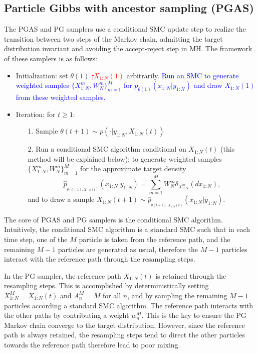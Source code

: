\documentclass[12pt]{article}
\newcommand{\fblue}[1]{\textcolor{blue}{{#1}}}
\newcommand{\fst}[1]{\textcolor{red}{\st{#1}}}
\def\phat{\widehat{p}}
\begin{document}
\subsection{Particle Gibbs with ancestor sampling (PGAS)}
The PGAS and PG samplers use a conditional SMC update step to realize the transition between two steps of the Markov chain, admitting the target distribution invariant and avoiding the accept-reject step in MH. The framework of these samplers is as follows:
\begin{itemize} \setlength\itemsep{0mm}
\item  Initialization: set $\theta(1)$ \fst{,$ X_{1:N}(1)$} arbitrarily. \fblue{Run an SMC to generate weighted samples $\{X_{1:N}^m, W_N^m\}_{m=1}^M$ for $p_{\theta(1)} (x_{1:N}|y_{1:N}) $ and draw $X_{1:N}(1)$ from these weighted samples. } 
\item Iteration: for $t\geq 1:$ 
\begin{itemize}\setlength\itemsep{0mm} \vspace{-1mm}
\item[1.] Sample $\theta(t+1)\sim p(\cdot| y_{1:N}, X_{1:N}(t))$ 
\item[2.] Run a conditional SMC algorithm conditional on $X_{1:N}(t)$ (this method will be explained below): to generate weighted samples $\{X_{1:N}^m, W_N^m\}_{m=1}^M$ for the approximate target density
\[ \phat_{_{\theta(t+1),X_{1:N}(t)}} (x_{1:N}|y_{1:N}) = \sum_{m=1}^M W_N^m \delta_{X_{1:N}^m}(dx_{1:N}),\]
and to draw a sample $X_{1:N}(t+1) \sim \phat_{_{\theta(t+1),X_{1:N}(t)}} (x_{1:N}|y_{1:N}) $.
\end{itemize}
\end{itemize}

\bigskip
The core of PGAS and PG  samplers is the conditional SMC algorithm. Intuitively, the conditional SMC algorithm is a standard SMC such that in each time step, one of the $M$ particle is taken from the reference path, and the remaining $M-1$ particles are generated as usual, therefore the $M-1$ particles interact with the reference path through the resampling steps. 

In the PG sampler, the reference path $X_{1:N}(t)$ is retained through the resampling steps. This is accomplished by deterministically setting $X_{1:N}^M=X_{1:N}(t)$ and $A_{n}^M = M$ for all $n$, and by sampling the remaining $M-1$ particles according a standard SMC algorithm. The reference path interacts with the other paths by contributing a weight $w_n^M$. This is the key to ensure the PG Markov chain converge to the target distribution. However, since the reference path is always retained, the resampling steps tend to direct the other particles towards the reference path therefore lead to poor mixing. 
\end{document}
